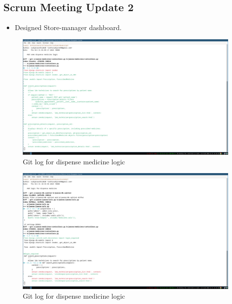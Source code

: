 \documentclass[a4paper,12pt]{article}
\begin{document}
\subsection{Scrum Meeting Update 2}
\begin{itemize}
    \item Designed Store-manager dashboard.
\end{itemize}

\begin{figure}[H]
    \centering
    \includegraphics[width=1\textwidth]{images/scr2git1.png}
    \caption{Git log for dispense medicine logic}
    \label{fig:gitlogscr21}
\end{figure}

\begin{figure}[H]
    \centering
    \includegraphics[width=1\textwidth]{images/scr2git2.png}
    \caption{Git log for dispense medicine logic}
    \label{fig:gitlogscr22}
\end{figure}
\end{document}
